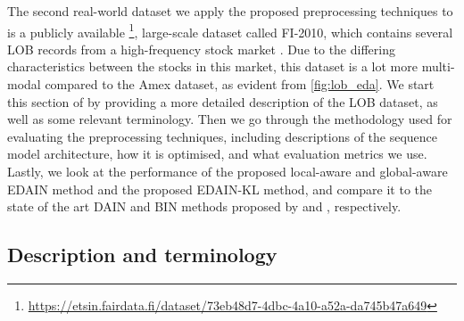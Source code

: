 \documentclass{statsmsc}
\begin{document}
{The second real-world dataset we apply the proposed preprocessing techniques to
is a publicly available%
\footnote{\url{https://etsin.fairdata.fi/dataset/73eb48d7-4dbc-4a10-a52a-da745b47a649}},
large-scale dataset called FI-2010, which contains several \ac{LOB} records from
a high-frequency stock market \citep{lob-data}.
Due to the differing characteristics between the stocks in this market, this dataset is a lot
more multi-modal compared to the Amex dataset, as evident from \cref{fig:lob_eda}.
We start this section of by providing a more detailed description of the \ac{LOB} dataset,
as well as some relevant terminology. Then we go through the methodology used for evaluating
the preprocessing techniques, including descriptions of the sequence model  architecture,
how it is optimised, and what evaluation metrics we use. Lastly, we look at the performance
of the proposed local-aware and global-aware \ac{EDAIN}  method and the proposed \ac{EDAIN-KL}
method, and compare it to the state of the art \ac{DAIN} and \ac{BIN} methods proposed
by \cite{dain} and \cite{bin}, respectively.


\subsection{Description and terminology}%
\label{sub:Description}

}
\end{document}
